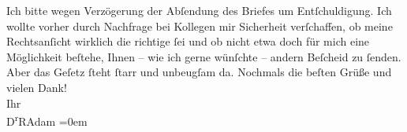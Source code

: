 \begin{ledgroupsized}[t]{13cm}
           \pstart
           Ich bitte wegen Verzögerung der Abſendung des Briefes um Entſchuldigung. Ich
                    wollte vorher durch Nachfrage bei Kollegen mir Sicherheit verſchaffen, ob meine
                    Rechtsanſicht wirklich die richtige ſei und ob nicht etwa doch für mich eine
                    Möglichkeit beſtehe, Ihnen – wie ich gerne wünſchte – andern Beſcheid zu ſenden.
                    Aber {\pb}das Geſetz ſteht ſtarr und
                    unbeugſam da.\pend
           \pstart
           Nochmals die beſten Grüße und vielen Dank!{\\[\baselineskip]}Ihr{\\[\baselineskip]}\spacefill\mbox{D\textsuperscript{r}RAdam}\pend
           \leftskip=0em{}
         
         \endnumbering{}\end{ledgroupsized}  \newcommand{\dateiname}{L02357}\newcommand{\titel}{Robert Adam an Arthur Schnitzler, 1. – 3. 11. 1920}\newcommand{\editorInnen}{Martin Anton Müller und Gerd-Hermann Susen}
      